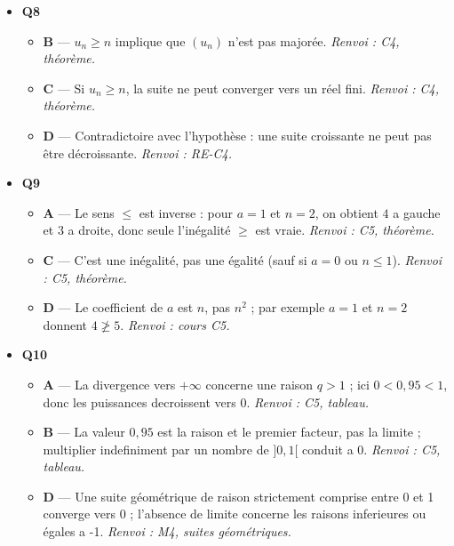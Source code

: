 \begin{itemize}
\begin{itemize}
    \item \textbf{B} — Contre-exemple : $u_n = (-1)^n/n$ converge vers 0 sans être croissante. \emph{Renvoi : C1, définition.}
    \item \textbf{C} — Être majorée ne suffit pas : la suite $(-1)^n$ est majorée mais diverge ; le théorème exige aussi que la suite soit croissante. \emph{Renvoi : C4, théorème.}
  \end{itemize}
  \item \textbf{Q8}
  \begin{itemize}
    \item \textbf{B} — $u_n \geq n$ implique que $(u_n)$ n'est pas majorée. \emph{Renvoi : C4, théorème.}
    \item \textbf{C} — Si $u_n \geq n$, la suite ne peut converger vers un réel fini. \emph{Renvoi : C4, théorème.}
    \item \textbf{D} — Contradictoire avec l'hypothèse : une suite croissante ne peut pas être décroissante. \emph{Renvoi : RE-C4.}
  \end{itemize}
  \item \textbf{Q9}
  \begin{itemize}
    \item \textbf{A} — Le sens $\leqslant$ est inverse : pour $a=1$ et $n=2$, on obtient $4$ a gauche et $3$ a droite, donc seule l'inégalité $\geqslant$ est vraie. \emph{Renvoi : C5, théorème.}
    \item \textbf{C} — C'est une inégalité, pas une égalité (sauf si $a=0$ ou $n \leq 1$). \emph{Renvoi : C5, théorème.}
    \item \textbf{D} — Le coefficient de $a$ est $n$, pas $n^2$ ; par exemple $a=1$ et $n=2$ donnent $4 \not\geqslant 5$. \emph{Renvoi : cours C5.}
  \end{itemize}
  \item \textbf{Q10}
  \begin{itemize}
    \item \textbf{A} — La divergence vers $+\infty$ concerne une raison $q>1$ ; ici $0<0{,}95<1$, donc les puissances decroissent vers $0$. \emph{Renvoi : C5, tableau.}
    \item \textbf{B} — La valeur $0{,}95$ est la raison et le premier facteur, pas la limite ; multiplier indefiniment par un nombre de $]0,1[$ conduit a $0$. \emph{Renvoi : C5, tableau.}
    \item \textbf{D} — Une suite géométrique de raison strictement comprise entre 0 et 1 converge vers 0 ; l'absence de limite concerne les raisons inferieures ou égales a -1. \emph{Renvoi : M4, suites géométriques.}

\end{itemize}
\end{itemize}
